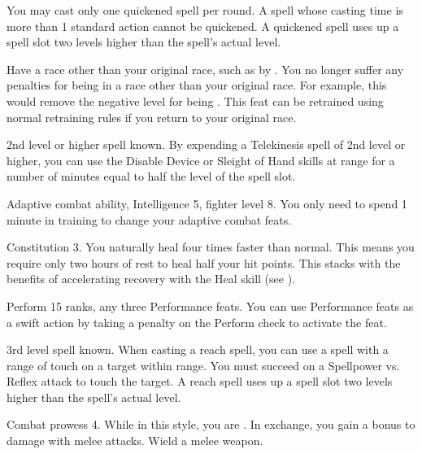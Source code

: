 You may cast only one quickened spell per round.
A spell whose casting time is more than 1 standard action cannot be quickened.
A quickened spell uses up a spell slot two levels higher than the spell's actual level.

\label{Racial Acclimation}
\featpres Have a race other than your original race, such as by .
\featben You no longer suffer any penalties for being in a race other than your original race.
For example, this would remove the negative level for being .
This feat can be retrained using normal retraining rules if you return to your original race.

\featpre 2nd level or higher  spell known.
\featben By expending a Telekinesis spell of 2nd level or higher, you can use the Disable Device or Sleight of Hand skills at \rngclose range for a number of minutes equal to half the level of the spell slot.

\featpres Adaptive combat ability, Intelligence 5, fighter level 8.
\featben You only need to spend 1 minute in training to change your adaptive combat feats.

\featpre Constitution 3.
\featben You naturally heal four times faster than normal.
This means you require only two hours of rest to heal half your hit points.
This stacks with the benefits of accelerating recovery with the Heal skill (see ).

\featpres Perform 15 ranks, any three Performance feats.
\featben You can use Performance feats as a swift action by taking a  penalty on the Perform check to activate the feat.

\featpre 3rd level spell known.
\featben When casting a reach spell, you can use a spell with a range of touch on a target within \rngclose range.
You must succeed on a Spellpower vs. Reflex attack to touch the target.
A reach spell uses up a spell slot two levels higher than the spell's actual level.

\featpre Combat prowess 4.
\featben While in this style, you are .
In exchange, you gain a  bonus to damage with melee attacks.
\stylereq Wield a melee weapon.

